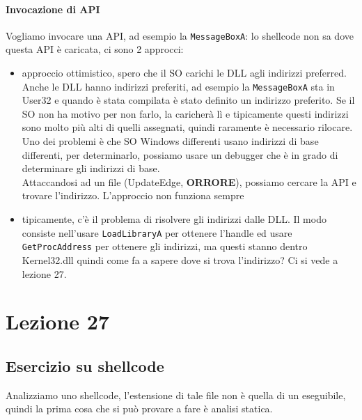 \documentclass[12pt, oneside]{extbook}
\begin{document}
\subsubsection{Invocazione di API}
Vogliamo invocare una API, ad esempio la \texttt{MessageBoxA}: lo shellcode non sa dove questa API è caricata, ci sono 2 approcci:
\begin{itemize}
	\item approccio ottimistico, spero che il SO carichi le DLL agli indirizzi preferred. Anche le DLL hanno indirizzi preferiti, ad esempio la \texttt{MessageBoxA} sta in User32 e quando è stata compilata è stato definito un indirizzo preferito. Se il SO non ha motivo per non farlo, la caricherà lì e tipicamente questi indirizzi sono molto più alti di quelli assegnati, quindi raramente è necessario rilocare.\\Uno dei problemi è che SO Windows differenti usano indirizzi di base differenti, per determinarlo, possiamo usare un debugger che è in grado di determinare gli indirizzi di base.\\Attaccandosi ad un file (UpdateEdge, \textbf{\textsf{ORRORE}}), possiamo cercare la API e trovare l'indirizzo. L'approccio non funziona sempre
	\item tipicamente, c'è il problema di risolvere gli indirizzi dalle DLL. Il modo consiste nell'usare \texttt{LoadLibraryA} per ottenere l'handle ed usare \texttt{GetProcAddress} per ottenere gli indirizzi, ma questi stanno dentro Kernel32.dll quindi come fa a sapere dove si trova l'indirizzo? Ci si vede a lezione 27.
\end{itemize}
\chapter{Lezione 27}
\section{Esercizio su shellcode}
Analizziamo uno shellcode, l'estensione di tale file non è quella di un eseguibile, quindi la prima cosa che si può provare a fare è analisi statica.
\end{document}
